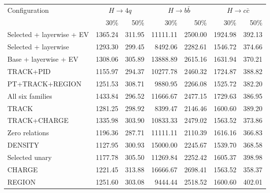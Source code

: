 \begin{table}[htbp]
\centering
\footnotesize
\setlength{\tabcolsep}{2.5pt}
\begin{tabularx}{\linewidth}{@{}Xrrrrrr@{}}
\toprule
Configuration & \multicolumn{2}{c}{$H\to4q$} & \multicolumn{2}{c}{$H\to b\bar b$} & \multicolumn{2}{c}{$H\to c\bar c$} \\
\cmidrule(lr){2-3}\cmidrule(lr){4-5}\cmidrule(lr){6-7}
 & 30\% & 50\% & 30\% & 50\% & 30\% & 50\% \\
\midrule
Selected + layerwise + EV & 1365.24 & 311.95 & 11111.11 & 2500.00 & 1924.98 & 392.13 \\ %
Selected + layerwise & 1293.30 & 299.45 & 8492.06 & 2282.61 & 1546.72 & 374.66 \\ %
Base + layerwise + EV & 1308.06 & 305.89 & 13888.89 & 2615.16 & 1631.94 & 370.21 \\ %
TRACK+PID & 1155.97 & 294.37 & 10277.78 & 2460.32 & 1724.87 & 388.82 \\ %
PT+TRACK+REGION & 1251.53 & 308.71 & 9880.95 & 2266.08 & 1525.72 & 382.20 \\ %
All six families & 1433.84 & 296.52 & 11666.67 & 2477.15 & 1729.63 & 386.95 \\ %
TRACK & 1281.25 & 298.92 & 8399.47 & 2146.46 & 1600.60 & 389.20 \\ %
TRACK+CHARGE & 1335.98 & 303.90 & 10833.33 & 2479.02 & 1563.52 & 373.86 \\ %
Zero relations & 1196.36 & 287.71 & 11111.11 & 2110.39 & 1616.16 & 366.83 \\ %
DENSITY & 1127.95 & 300.93 & 15000.00 & 2245.67 & 1539.70 & 368.58 \\ %
Selected unary & 1177.78 & 305.50 & 11269.84 & 2252.42 & 1605.37 & 398.98 \\ %
CHARGE & 1221.45 & 313.88 & 16666.67 & 2698.41 & 1563.52 & 358.37 \\ %
REGION & 1251.60 & 303.08 & 9444.44 & 2518.52 & 1600.60 & 402.01 \\ %

\end{tabularx}
\end{table}
